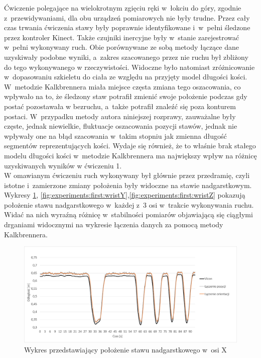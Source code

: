 Ćwiczenie polegające na wielokrotnym zgięciu ręki w~łokciu do góry, zgodnie z~przewidywaniami, dla obu urządzeń pomiarowych nie były trudne. Przez cały czas trwania ćwiczenia stawy były poprawnie identyfikowane i~w~pełni śledzone przez kontroler Kinect. Także czujniki inercyjne były w~stanie zarejestrować w~pełni  wykonywany ruch. Obie porównywane ze sobą metody łączące dane uzyskiwały podobne wyniki, a~zakres szacowanego przez nie ruchu był zbliżony do tego wykonywanego w rzeczywistości. Widoczne było natomiast zróżnicowanie w~dopasowaniu szkieletu do ciała ze względu na przyjęty model długości kości. W~metodzie Kalkbrennera miała miejsce częsta zmiana tego oszacowania, co wpływało na to, że śledzony staw potrafił zmienić swoje położenie podczas gdy postać pozostawała w bezruchu, a~także potrafił znaleźć się poza konturem postaci. W~przypadku metody autora niniejszej rozprawy, zauważalne były częste, jednak niewielkie, fluktuacje oszacowania pozycji stawów, jednak nie wpływały one na błąd szacowania w~takim stopniu jak zmienna długość segmentów reprezentujących kości. Wydaje się również, że to właśnie brak stałego modelu długości kości w~metodzie Kalkbrennera ma największy wpływ na różnicę uzyskiwanych wyników w ćwiczeniu 1. \\
						
W omawianym ćwiczeniu ruch wykonywany był głównie przez przedramię, czyli istotne i~zamierzone zmiany położenia były widoczne na stawie nadgarstkowym. Wykresy \ref{fig:experiments:first:wristX}, \ref{fig:experiments:first:wristY},\ref{fig:experiments:first:wristZ} pokazują położenie stawu nadgarstkowego w~każdej z~3 osi w~trakcie wykonywania ruchu. Widać na nich wyraźną różnicę w~stabilności pomiarów objawiającą się ciągłymi drganiami widocznymi na wykresie łączenia danych za pomocą metody Kalkbrennera.
						
\begin{savenotes}
	\begin{figure}[!htb]
		\centering
		\includegraphics[width=0.9\linewidth]{images/100/Slide4.png}
		\caption{Wykres przedstawiający położenie stawu nadgarstkowego w~osi X}
		\label{fig:experiments:first:wristX}
	\end{figure}
\end{savenotes}
								
